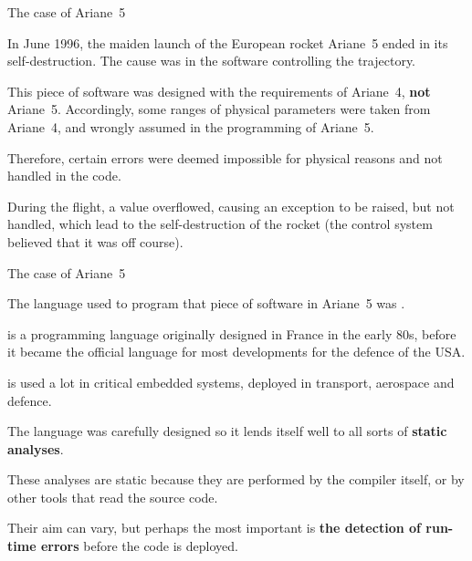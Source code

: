 \documentclass[compress,dvips,xcolor={dvipsnames},t]{beamer}
\begin{document}
%
\begin{frame}{The case of Ariane~5}

  In June 1996, the maiden launch of the European rocket Ariane~5
  ended in its self\hyp{}destruction. The cause was in the software
  controlling the trajectory.

  \bigskip

  This piece of software was designed with the requirements of
  Ariane~4, \textbf{not} Ariane~5. Accordingly, some ranges of
  physical parameters were taken from Ariane~4, and wrongly assumed in
  the programming of Ariane~5.

  \bigskip

  Therefore, certain errors were deemed impossible for physical
  reasons and not handled in the code.

  \bigskip

  During the flight, a value overflowed, causing an exception to be
  raised, but not handled, which lead to the self\hyp{}destruction of
  the rocket (the control system believed that it was off course).

\end{frame}

%
\begin{frame}{The case of Ariane~5}

  The language used to program that piece of software in Ariane~5 was
  \Ada.

  \bigskip

  \Ada is a programming language originally designed in France in the
  early 80s, before it became the official language for most
  developments for the defence of the USA.

  \bigskip

  \Ada is used a lot in critical embedded systems, deployed in
  transport, aerospace and defence.

  \bigskip

  The language was carefully designed so it lends itself well to all
  sorts of \textbf{static analyses}.

  \bigskip

  These analyses are static because they are performed by the \Ada
  compiler itself, or by other tools that read the source code.

  \bigskip

  Their aim can vary, but perhaps the most important is \textbf{the
    detection of run\hyp{}time errors} before the code is deployed.

\end{frame}
\end{document}
